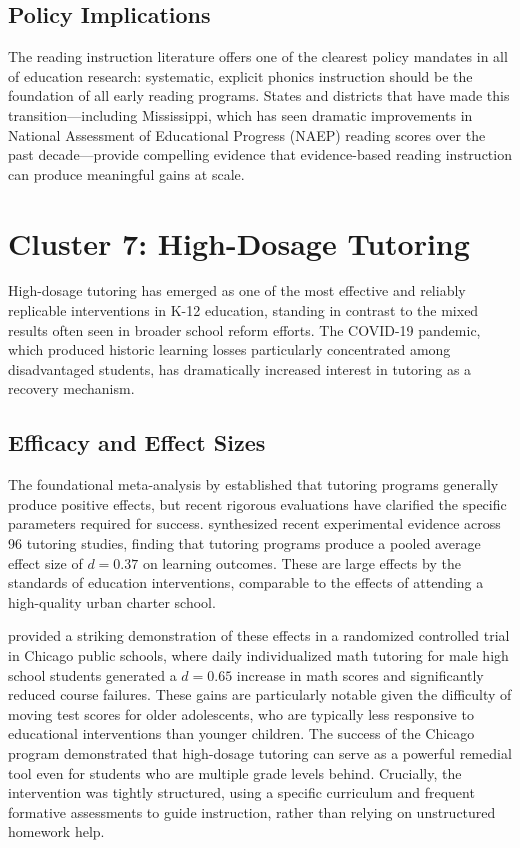 \documentclass[12pt,letterpaper]{article}
\begin{document}
\subsection{Policy Implications}

The reading instruction literature offers one of the clearest policy mandates in all of education research: systematic, explicit phonics instruction should be the foundation of all early reading programs. States and districts that have made this transition---including Mississippi, which has seen dramatic improvements in National Assessment of Educational Progress (NAEP) reading scores over the past decade---provide compelling evidence that evidence-based reading instruction can produce meaningful gains at scale.

\section{Cluster 7: High-Dosage Tutoring}

High-dosage tutoring has emerged as one of the most effective and reliably replicable interventions in K-12 education, standing in contrast to the mixed results often seen in broader school reform efforts. The COVID-19 pandemic, which produced historic learning losses particularly concentrated among disadvantaged students, has dramatically increased interest in tutoring as a recovery mechanism.

\subsection{Efficacy and Effect Sizes}

The foundational meta-analysis by \citet{cohen1982} established that tutoring programs generally produce positive effects, but recent rigorous evaluations have clarified the specific parameters required for success. \citet{nickow2020} synthesized recent experimental evidence across 96 tutoring studies, finding that tutoring programs produce a pooled average effect size of $d = 0.37$ on learning outcomes. These are large effects by the standards of education interventions, comparable to the effects of attending a high-quality urban charter school.

\citet{cook2015} provided a striking demonstration of these effects in a randomized controlled trial in Chicago public schools, where daily individualized math tutoring for male high school students generated a $d = 0.65$ increase in math scores and significantly reduced course failures. These gains are particularly notable given the difficulty of moving test scores for older adolescents, who are typically less responsive to educational interventions than younger children. The success of the Chicago program demonstrated that high-dosage tutoring can serve as a powerful remedial tool even for students who are multiple grade levels behind. Crucially, the intervention was tightly structured, using a specific curriculum and frequent formative assessments to guide instruction, rather than relying on unstructured homework help.
\end{document}
